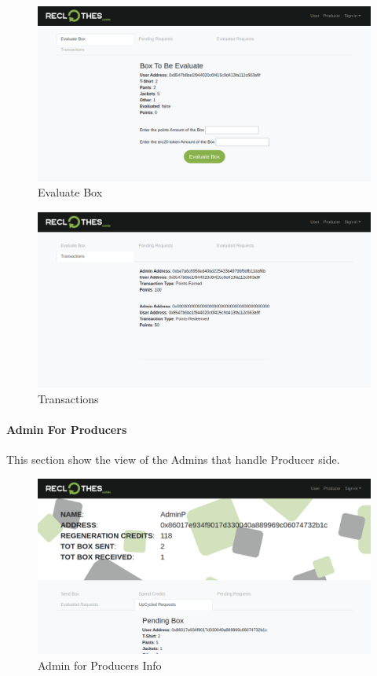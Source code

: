 {\begin{figure}[h!]
    \centering
    \includegraphics[totalheight=7.5cm]{img/dapp/admin-evaluate.png}
    \caption{Evaluate Box}
    \label{fig:evaluate_box}
\end{figure}

\begin{figure}[h!]
    \centering
    \includegraphics[totalheight=7.5cm]{img/dapp/admin-tx.png}
    \caption{Transactions}
    \label{fig:admin-tx}
\end{figure}

\paragraph{Admin For Producers}

This section show the view of the Admins that handle Producer side.

\begin{figure}[h!]
    \centering
    \includegraphics[totalheight=7.5cm]{img/dapp/adminp-info.png}
    \caption{Admin for Producers Info}
    \label{fig:adminp-info}
\end{figure}

}
